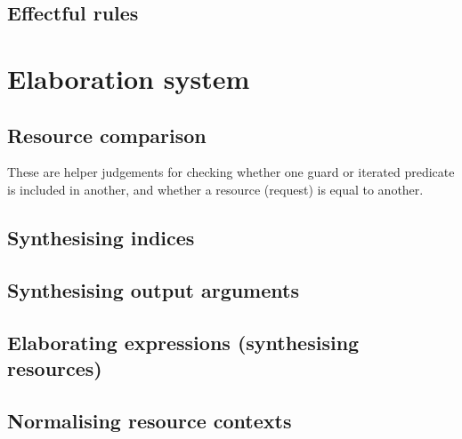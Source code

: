 \cndefnsexplXXaction%
\cndefnsexplXXmemop%

\subsection{Effectful rules}

\cndefnsexplXXstmt%

\section{Elaboration system}\label{sec:elab-system}

\subsection{Resource comparison}
These are helper judgements for checking whether one guard or iterated
predicate is included in another, and whether a resource (request) is
equal to another.

\cndefnscmpXXres%

\subsection{Synthesising indices}\label{subsec:app-synth-indices}

\cndefnsinfXXindex%

\subsection{Synthesising output arguments}\label{subsec:app-synth-oargs}

\cndefnsinfXXoarg%

\subsection{Elaborating expressions (synthesising resources)}

\cndefnselabXXaction%
\cndefnselabXXmemop%
\cndefnselabXXspine%
\cndefnselabXXexpr%

\subsection{Normalising resource contexts}

